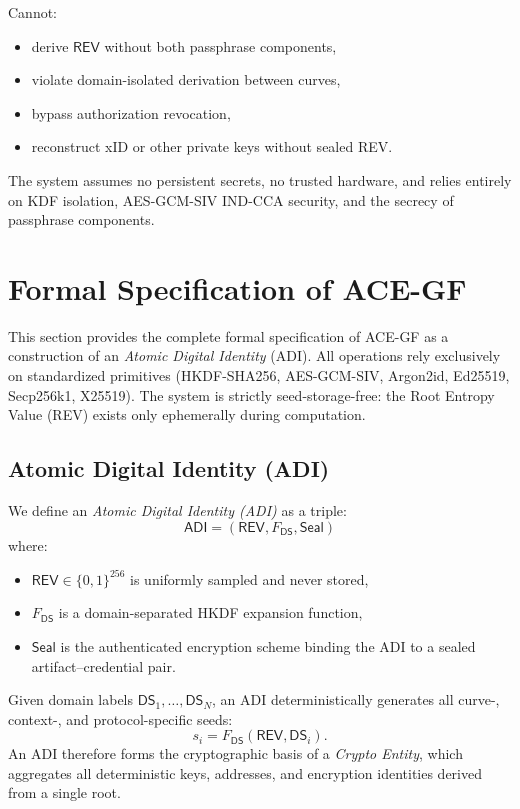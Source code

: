\documentclass[12pt,a4paper]{article}
\begin{document}
  Cannot:
  \begin{itemize}
   \item derive $\mathsf{REV}$ without both passphrase components,
   \item violate domain-isolated derivation between curves,
   \item bypass authorization revocation,
   \item reconstruct xID or other private keys without sealed REV.
  \end{itemize}

  The system assumes no persistent secrets, no trusted hardware, and relies entirely on
  KDF isolation, AES-GCM-SIV IND-CCA security, and the secrecy of passphrase components.


  \section{Formal Specification of ACE-GF}

  This section provides the complete formal specification of ACE-GF as a
  construction of an \emph{Atomic Digital Identity} (ADI).
  All operations rely exclusively on standardized primitives
  (HKDF-SHA256, AES-GCM-SIV, Argon2id, Ed25519, Secp256k1, X25519).
  The system is strictly seed-storage-free: the Root Entropy Value (REV)
  exists only ephemerally during computation.

  \subsection{Atomic Digital Identity (ADI)}

  We define an \emph{Atomic Digital Identity (ADI)} as a triple:
  \[
   \mathsf{ADI} = (\mathsf{REV}, F_{\mathsf{DS}}, \mathsf{Seal})
  \]
  where:
  \begin{itemize}
   \item $\mathsf{REV} \in \{0,1\}^{256}$ is uniformly sampled and never stored,
   \item $F_{\mathsf{DS}}$ is a domain-separated HKDF expansion function,
   \item $\mathsf{Seal}$ is the authenticated encryption scheme binding the ADI
   to a sealed artifact–credential pair.
  \end{itemize}

  Given domain labels $\mathsf{DS}_1, \ldots, \mathsf{DS}_N$, an ADI deterministically
  generates all curve-, context-, and protocol-specific seeds:
  \[
   s_i = F_{\mathsf{DS}}(\mathsf{REV}, \mathsf{DS}_i).
  \]
  An ADI therefore forms the cryptographic basis of a \emph{Crypto Entity},
  which aggregates all deterministic keys, addresses, and encryption identities
  derived from a single root.
\end{document}
